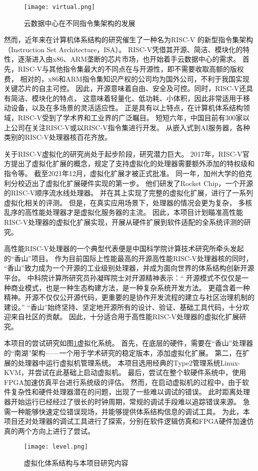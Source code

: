 \begin{figure}[htbp]
\centering
\texttt{[image: virtual.png]}
\caption{云数据中心在不同指令集架构的发展}
\end{figure}

然而，近年来在计算机体系结构的研究催生了一种名为RISC-V\cite{asanovic2014instruction}
的新型指令集架构（Instruction Set Architecture，ISA）。
RISC-V凭借其开源、简洁、模块化的特性，逐渐进入由x86、ARM垄断的芯片市场，也开始着手云数据中心的需求。
首先，RISC-V与其他指令集最大的不同点在与开源性，即不需要收取高额的版权费，
相对的，x86和ARM指令集知识产权的公司均为国外公司，不利于我国实现关键芯片的自主可控。
因此，开源意味着自由、安全及可控。同时，RISC-V还具有简洁、模块化的特点，
这意味着轻量化、低功耗、小体积，因此非常适用于移动设备，以及在多场景的灵活适应性。
正是具有以上特点，在计算机体系结构领域，RISC-V受到了学术界和工业界的广泛瞩目。
短短六年，中国目前有300家以上公司在关注RISC-V或以RISC-V指令集进行开发。
从嵌入式到AI服务器，各种类别的RISC-V处理器核百花齐放。

关于RISC-V虚拟化的研究尚处于起步阶段，研究潜力巨大。
2017年，RISC-V官方提出了虚拟化扩展的概念，规定了支持虚拟化的处理器需要额外添加的特权级和指令等。
截至2021年12月，虚拟化扩展才被正式批准。
同一年，加州大学的伯克利分校迈出了虚拟化扩展硬件实现的第一步。
他们研发了Rocket Chip\cite{itco2022rocket}，一个开源的RISC-V顺序流水线处理器。
并在其上实现了完整的虚拟化扩展，进行了一系列虚拟化相关的评测。
但是，在真实应用场景下，处理器的情况会更为复杂，
多核乱序的高性能处理器才是虚拟化服务器的主流。
因此，本项目计划瞄准高性能RISC-V处理器的虚拟化扩展实现，开展从硬件扩展到软件适配的全系统评测的研究。

高性能RISC-V处理器的一个典型代表便是中国科学院计算技术研究所牵头发起的“香山”项目。
作为目前国际上性能最高的开源高性能RISC-V处理器核的同时，
“香山”致力成为一个开源的工业级别处理器，并成为面向世界的体系结构创新开源平台。
中科院计算所研究员孙凝晖院士对开源精神表示：“
开源模式不仅仅是一种商业模式，也是一种生态构建方法，是一种复杂系统开发方法。
更蕴含着一种精神。开源不仅仅公开源代码，更重要的是协作开发流程的建立与社区治理机制的建设。”
“香山”始终坚持、坚定地开源所有的设计、验证、基础工具代码，十分欢迎来自社区的贡献。
因此，十分适合用于高性能RISC-V处理器的虚拟化扩展研究。

本项目的尝试研究如图\ref{fig:level}虚拟化系统。
首先，在底层的硬件，需要在“香山”处理器的“南湖”架构——一个用于学术研究的稳定版本，添加虚拟化扩展。
第二，在扩展的处理器中运行虚拟机管理系统。
本项目选用经典的Type2管理系统Linux-KVM\cite{kvm:H-ext}，并尝试在此基础上启动虚拟机。
最后，尝试在整个软硬件系统中，使用FPGA加速仿真平台进行系统级的评估。
然而，在启动虚拟机的过程中，由于软件复杂性和硬件处理器潜在的问题，出现了一些难以调试的错误。
此时距离处理器开始运行已经经过了很长的时钟周期，常规的调试手段难以追踪错误来源。
急需一种能够快速定位错误现场，并能够提供体系结构信息的调试工具。
为此，本项目还对处理器的调试工具进行了探索，分别在软件逻辑仿真和FPGA硬件加速仿真的两个方向上进行了尝试。

\begin{figure}[htbp]
    \centering
    \texttt{[image: level.png]}
\caption{虚拟化体系结构与本项目研究内容}
    \label{fig:level}
\end{figure}
